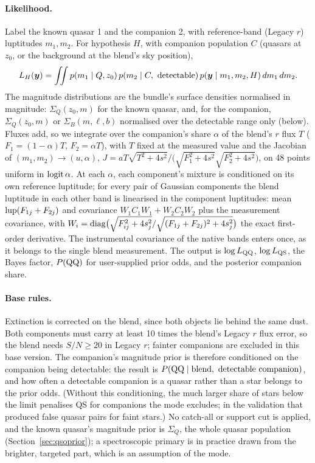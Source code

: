 \documentclass[11pt,a4paper]{article}
\newcommand{\vect}[1]{\boldsymbol{#1}}
\begin{document}
\paragraph{Likelihood.} Label the known quasar 1 and the companion 2, with reference-band (Legacy $r$)
luptitudes $m_1, m_2$. For hypothesis $H$, with companion population $C$ (quasars at $z_0$, or the
background at the blend's sky position),
\begin{equation}
L_H(\vect{y})=\iint p(m_1\mid Q,z_0)\,p(m_2\mid C,\ {\rm detectable})\,p(\vect{y}\mid m_1,m_2,H)\,dm_1\,dm_2 .
\end{equation}
The magnitude distributions are the bundle's surface densities normalised in magnitude:
$\Sigma_Q(z_0,m)$ for the known quasar, and, for the companion, $\Sigma_Q(z_0,m)$ or
$\Sigma_B(m,\ell,b)$ normalised over the detectable range only (below). Fluxes add, so we integrate over
the companion's share $\alpha$ of the blend's $r$ flux $T$ ($F_1=(1-\alpha)T$, $F_2=\alpha T$), with $T$
fixed at the measured value and the Jacobian of $(m_1,m_2)\to(u,\alpha)$,
$J=aT\sqrt{T^2+4s^2}/\bigl(\sqrt{F_1^2+4s^2}\sqrt{F_2^2+4s^2}\bigr)$, on 48 points uniform in
${\rm logit}\,\alpha$. At each $\alpha$, each component's mixture is conditioned on its own reference
luptitude; for every pair of Gaussian components the blend luptitude in each other band is linearised in
the component luptitudes: mean ${\rm lup}(F_{1j}+F_{2j})$ and covariance $W_1C_1W_1+W_2C_2W_2$ plus the
measurement covariance, with $W_i={\rm diag}\bigl(\sqrt{F_{ij}^2+4s_j^2}/\sqrt{(F_{1j}+F_{2j})^2+4s_j^2}\bigr)$
the exact first-order derivative. The instrumental covariance of the native bands enters once, as it
belongs to the single blend measurement. The output is $\log L_{\rm QQ}$, $\log L_{\rm QS}$, the Bayes
factor, $P({\rm QQ})$ for user-supplied prior odds, and the posterior companion share.

\paragraph{Base rules.} Extinction is corrected on the blend, since both objects lie behind the same dust.
Both components must carry at least 10 times the blend's Legacy $r$ flux error, so the blend needs
$S/N\ge20$ in Legacy $r$; fainter companions are excluded in this base version. The companion's magnitude
prior is therefore conditioned on the companion being detectable: the result is
$P({\rm QQ}\mid\text{blend},\ \text{detectable companion})$, and how often a detectable companion is a
quasar rather than a star belongs to the prior odds. (Without this conditioning, the much larger share of
stars below the limit penalises QS for companions the mode excludes; in the validation that produced
false quasar pairs for faint stars.) No catch-all or support cut is applied, and the known quasar's
magnitude prior is $\Sigma_Q$, the whole quasar population (Section~\ref{sec:qsoprior}); a spectroscopic
primary is in practice drawn from the brighter, targeted part, which is an assumption of the mode.
\end{document}
